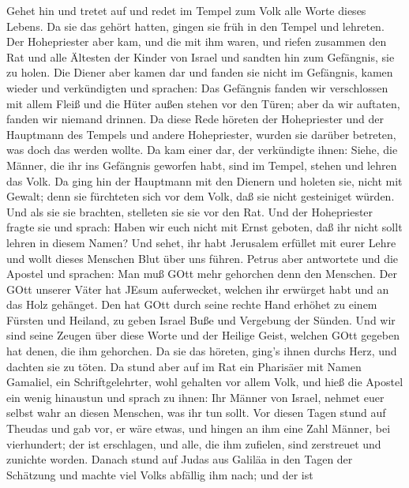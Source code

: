  Gehet hin und tretet auf und redet im Tempel zum Volk alle
Worte dieses Lebens.  Da sie das gehört hatten, gingen sie
früh in den Tempel und lehreten. Der Hohepriester aber kam, und die mit
ihm waren, und riefen zusammen den Rat und alle Ältesten der Kinder von
Israel und sandten hin zum Gefängnis, sie zu holen.  Die
Diener aber kamen dar und fanden sie nicht im Gefängnis, kamen wieder
und verkündigten  und sprachen: Das Gefängnis fanden wir
verschlossen mit allem Fleiß und die Hüter außen stehen vor den Türen;
aber da wir auftaten, fanden wir niemand drinnen.  Da diese
Rede höreten der Hohepriester und der Hauptmann des Tempels und andere
Hohepriester, wurden sie darüber betreten, was doch das werden wollte.
 Da kam einer dar, der verkündigte ihnen: Siehe, die
Männer, die ihr ins Gefängnis geworfen habt, sind im Tempel, stehen und
lehren das Volk.  Da ging hin der Hauptmann mit den Dienern
und holeten sie, nicht mit Gewalt; denn sie fürchteten sich vor dem
Volk, daß sie nicht gesteiniget würden.  Und als sie sie
brachten, stelleten sie sie vor den Rat. Und der Hohepriester fragte sie
 und sprach: Haben wir euch nicht mit Ernst geboten, daß
ihr nicht sollt lehren in diesem Namen? Und sehet, ihr habt Jerusalem
erfüllet mit eurer Lehre und wollt dieses Menschen Blut über uns führen.
 Petrus aber antwortete und die Apostel und sprachen: Man
muß GOtt mehr gehorchen denn den Menschen.  Der GOtt
unserer Väter hat JEsum auferwecket, welchen ihr erwürget habt und an
das Holz gehänget.  Den hat GOtt durch seine rechte Hand
erhöhet zu einem Fürsten und Heiland, zu geben Israel Buße und Vergebung
der Sünden.  Und wir sind seine Zeugen über diese Worte und
der Heilige Geist, welchen GOtt gegeben hat denen, die ihm gehorchen.
 Da sie das höreten, ging's ihnen durchs Herz, und dachten
sie zu töten.  Da stund aber auf im Rat ein Pharisäer mit
Namen Gamaliel, ein Schriftgelehrter, wohl gehalten vor allem Volk, und
hieß die Apostel ein wenig hinaustun  und sprach zu ihnen:
Ihr Männer von Israel, nehmet euer selbst wahr an diesen Menschen, was
ihr tun sollt.  Vor diesen Tagen stund auf Theudas und gab
vor, er wäre etwas, und hingen an ihm eine Zahl Männer, bei vierhundert;
der ist erschlagen, und alle, die ihm zufielen, sind zerstreuet und
zunichte worden.  Danach stund auf Judas aus Galiläa in den
Tagen der Schätzung und machte viel Volks abfällig ihm nach; und der ist
